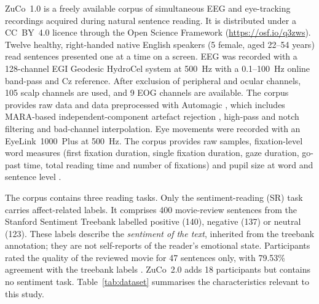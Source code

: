 \documentclass[11pt,a4paper]{article}
\begin{document}
ZuCo~1.0 \cite{Hollenstein2018} is a freely available corpus of simultaneous EEG and eye-tracking recordings acquired during natural sentence reading. It is distributed under a CC~BY~4.0 licence through the Open Science Framework (\url{https://osf.io/q3zws}). Twelve healthy, right-handed native English speakers (5 female, aged 22--54 years) read sentences presented one at a time on a screen. EEG was recorded with a 128-channel EGI Geodesic HydroCel system at 500~Hz with a 0.1--100~Hz online band-pass and Cz reference. After exclusion of peripheral and ocular channels, 105 scalp channels are used, and 9 EOG channels are available. The corpus provides raw data and data preprocessed with Automagic \cite{Pedroni2019}, which includes MARA-based independent-component artefact rejection \cite{Winkler2011}, high-pass and notch filtering and bad-channel interpolation. Eye movements were recorded with an EyeLink~1000~Plus at 500~Hz. The corpus provides raw samples, fixation-level word measures (first fixation duration, single fixation duration, gaze duration, go-past time, total reading time and number of fixations) and pupil size at word and sentence level \cite{Hollenstein2018}.

The corpus contains three reading tasks. Only the sentiment-reading (SR) task carries affect-related labels. It comprises 400 movie-review sentences from the Stanford Sentiment Treebank \cite{Socher2013} labelled positive (140), negative (137) or neutral (123). These labels describe the \emph{sentiment of the text}, inherited from the treebank annotation; they are not self-reports of the reader's emotional state. Participants rated the quality of the reviewed movie for 47 sentences only, with 79.53\% agreement with the treebank labels \cite{Hollenstein2018}. ZuCo~2.0 \cite{Hollenstein2020} adds 18 participants but contains no sentiment task. Table~\ref{tab:dataset} summarises the characteristics relevant to this study.
\end{document}
